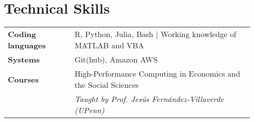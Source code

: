 \documentclass[11pt, a4paper]{article}
\begin{document}
 \section*{Technical Skills}
 \begin{tabular}{ll}
    \textbf{Coding languages} & R, Python, Julia, Bash $|$ Working knowledge of MATLAB and VBA \\
    \textbf{Systems} & Git(hub), Amazon AWS \\
    \textbf{Courses} & High-Performance Computing in Economics and the Social Sciences \\
    & \textit{Taught by Prof. Jesús Fernández-Villaverde (UPenn)} \\
     
 \end{tabular}
 
\end{document}

